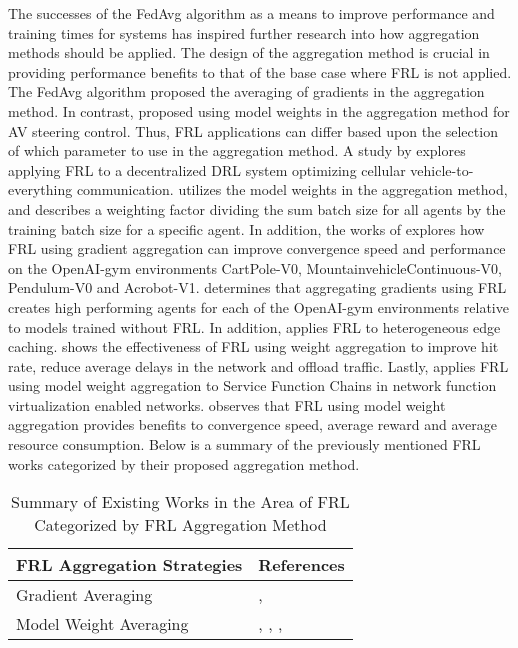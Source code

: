 The successes of the FedAvg algorithm as a means to improve performance and training times for systems has inspired further research into how aggregation methods should be applied.  The design of the aggregation method is crucial in providing performance benefits to that of the base case where FRL is not applied.  The FedAvg \cite{BrendanMcMahan2017a} algorithm proposed the averaging of gradients in the aggregation method.  In contrast, \cite{Liang2019} proposed using model weights in the aggregation method for AV steering control. Thus, FRL applications can differ based upon the selection of which parameter to use in the aggregation method.  A study by \cite{ZhangX2020} explores applying FRL to a decentralized DRL system optimizing cellular vehicle-to-everything communication. \cite{ZhangX2020} utilizes the model weights in the aggregation method, and describes a weighting factor dividing the sum batch size for all agents by the training batch size for a specific agent.  In addition, the works of \cite{LimHyun2021} explores how FRL using gradient aggregation can improve convergence speed and performance on the OpenAI-gym environments CartPole-V0, MountainvehicleContinuous-V0, Pendulum-V0 and Acrobot-V1.  \cite{LimHyun2021} determines that aggregating gradients using FRL creates high performing agents for each of the OpenAI-gym environments relative to models trained without FRL.  In addition, \cite{WangXiaofei2021} applies FRL to heterogeneous edge caching.  \cite{WangXiaofei2021} shows the effectiveness of FRL using weight aggregation to improve hit rate, reduce average delays in the network and offload traffic. Lastly, \cite{Huang2021} applies FRL using model weight aggregation to Service Function Chains in network function virtualization enabled networks. \cite{Huang2021} observes that FRL using model weight aggregation provides benefits to convergence speed, average reward and average resource consumption. Below is a summary of the previously mentioned FRL works categorized by their proposed aggregation method.

\begin{table}[H]
  \centering
  \caption{Summary of Existing Works in the Area of FRL Categorized by FRL Aggregation Method}
    \begin{tabular}{ll} \toprule
    \textbf{FRL Aggregation Strategies} & \textbf{References} \\ \midrule
    \midrule
    Gradient Averaging & \cite{BrendanMcMahan2017a}, \cite{LimHyun2021} \\
    Model Weight Averaging & \cite{Liang2019}, \cite{ZhangX2020}, \cite{WangXiaofei2021}, \cite{Huang2021} \\ \bottomrule
    \end{tabular}%
  \label{tab:addlabel}%
\end{table}%


